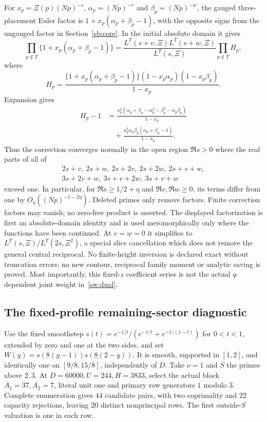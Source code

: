 \documentclass[11pt]{article}
\theoremstyle{definition}\newtheorem{definition}[theorem]{Definition}
\theoremstyle{remark}\newtheorem{remark}[theorem]{Remark}
\begin{document}
For $x_p=\Xi(p)(Np)^{-s}$, $\alpha_p=(Np)^{-v}$ and
$\beta_p=(Np)^{-w}$, the gauged three-placement Euler factor is
$1+x_p(\alpha_p+\beta_p-1)$, with the opposite signs from the ungauged
factor in Section~\ref{sb:core}. In the initial absolute domain it gives
\[
 \prod_{p\notin T}\{1+x_p(\alpha_p+\beta_p-1)\}
 =\frac{L^T(s+v,\Xi)L^T(s+w,\Xi)}{L^T(s,\Xi)}\prod_{p\notin T}H_p,
\]
where
\[
 H_p=\frac{\{1+x_p(\alpha_p+\beta_p-1)\}
                 (1-x_p\alpha_p)(1-x_p\beta_p)}{1-x_p}.
\]
Expansion gives
\begin{align*}
 H_p-1&=\frac{x_p^2(\alpha_p+\beta_p-\alpha_p^2-\beta_p^2-\alpha_p\beta_p)}{1-x_p}\\
 &\quad+\frac{x_p^3\alpha_p\beta_p(\alpha_p+\beta_p-1)}{1-x_p}.
\end{align*}
Thus the correction converges normally in the open region $\Re s>0$
where the real parts of all of
\[
 \begin{gathered}
 2s+v,\ 2s+w,\ 2s+2v,\ 2s+2w,\ 2s+v+w,\\
 3s+2v+w,\ 3s+v+2w,\ 3s+v+w
 \end{gathered}
\]
exceed one. In particular, for $\Re s\ge1/2+\eta$ and
$\Re v,\Re w\ge0$, its terms differ from one by
$O_\eta((Np)^{-1-2\eta})$. Deleted primes only remove factors.
Finite correction factors may vanish; no zero-free product is asserted.
The displayed factorization is first an absolute-domain identity and is
used meromorphically only where the functions have been continued.
At $v=w=0$ it simplifies to $L^T(s,\Xi)/L^T(2s,\Xi^2)$, a special
slice cancellation which does not remove the general central reciprocal.
No finite-height inversion is declared exact without truncation errors;
no new contour, reciprocal family moment or analytic saving is proved.
Most importantly, this fixed-$z$ coefficient series is not the actual
$q$-dependent joint weight in~\eqref{sw:dual}.

\subsection{The fixed-profile remaining-sector diagnostic}
Use the fixed smoothstep $s(t)=e^{-1/t}/(e^{-1/t}+e^{-1/(1-t)})$ for
$0<t<1$, extended by zero and one at the two sides, and set
$W(y)=s(8(y-1))s(8(2-y))$. It is smooth, supported in $[1,2]$, and
identically one on $[9/8,15/8]$, independently of $D$.
Take $\nu=1$ and $S$ the primes above $2,3$.
At $D=60000,U=244,H=3833$, select the actual block $A_1=37,A_2=7$,
literal unit one and primary row generators $1$ modulo $3$. Complete enumeration gives $44$ candidate pairs,
with two coprimality and $22$ capacity rejections, leaving $20$ distinct
nonprincipal rows. The first outside-$S$ valuation is one in each row.
\end{document}
